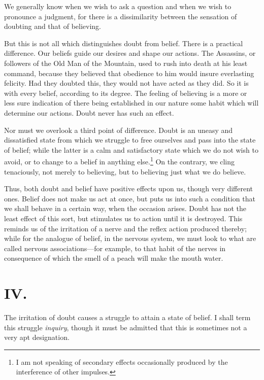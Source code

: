 We generally know when we wish to ask a question and when we wish to
pronounce a judgment, for there is a dissimilarity between the
sensation of doubting and that of believing.

But this is not all which distinguishes doubt from belief. There is a
practical difference. Our beliefs guide our desires and shape our
actions. The Assassins, or followers of the Old Man of the Mountain,
used to rush into death at his least command, because they believed
that obedience to him would insure everlasting felicity. Had they
doubted this, they would not have acted as they did. So it is with
every belief, according to its degree. The feeling of believing is a
more or less sure indication of there being established in our nature
some habit which will determine our actions. Doubt never has such an
effect.

Nor must we overlook a third point of difference. Doubt is an uneasy
and dissatisfied state from which we struggle to free ourselves and
pass into the state of belief; while the latter is a calm and
satisfactory state which we do not wish to avoid, or to change to a
belief in anything else.\footnote{I am not speaking of secondary
effects occasionally produced by the interference of other impulses.}
On the contrary, we cling tenaciously, not merely to believing, but to
believing just what we do believe.

Thus, both doubt and belief have positive effects upon us,
though very different ones. Belief does not make us act at once, but
puts us into such a condition that we shall behave in a certain way,
when the occasion arises. Doubt has not the least effect of this sort,
but stimulates us to action until it is destroyed. This reminds us of
the irritation of a nerve and the reflex action produced thereby;
while for the analogue of belief, in the nervous system, we must look
to what are called nervous as\-so\-ci\-a\-tions---for example, to
that habit of the nerves in consequence of which the smell of a peach
will make the mouth water.

\section{IV.}

The irritation of doubt causes a struggle to attain a state of belief.
I shall term this struggle \textit{inquiry}, though it must be admitted
that this is sometimes not a very apt designation.

